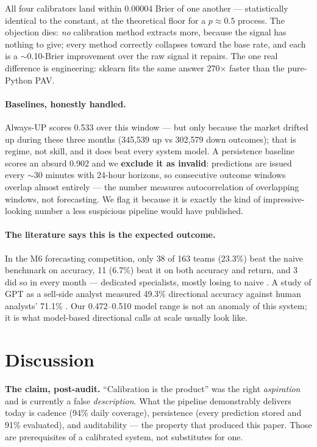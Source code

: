 \documentclass[10pt]{article}
\begin{document}
All four calibrators land within 0.00004 Brier of one another --- statistically identical to the constant, at the theoretical floor for a $p\approx0.5$ process. The objection dies: \emph{no} calibration method extracts more, because the signal has nothing to give; every method correctly collapses toward the base rate, and each is a $\sim$0.10-Brier improvement over the raw signal it repairs. The one real difference is engineering: sklearn fits the same answer 270$\times$ faster than the pure-Python PAV.

\paragraph{Baselines, honestly handled.} Always-UP scores 0.533 over this window --- but only because the market drifted up during these three months (345{,}539 up vs 302{,}579 down outcomes); that is regime, not skill, and it does beat every system model. A persistence baseline scores an absurd 0.902 and we \textbf{exclude it as invalid}: predictions are issued every $\sim$30 minutes with 24-hour horizons, so consecutive outcome windows overlap almost entirely --- the number measures autocorrelation of overlapping windows, not forecasting. We flag it because it is exactly the kind of impressive-looking number a less suspicious pipeline would have published.

\paragraph{The literature says this is the expected outcome.} In the M6 forecasting competition, only 38 of 163 teams (23.3\%) beat the naive benchmark on accuracy, 11 (6.7\%) beat it on both accuracy and return, and 3 did so in every month --- dedicated specialists, mostly losing to naive \citep{m62023}. A study of GPT as a sell-side analyst measured 49.3\% directional accuracy against human analysts' 71.1\% \citep{gptanalyst2024}. Our 0.472--0.510 model range is not an anomaly of this system; it is what model-based directional calls at scale usually look like.

\section{Discussion}
\label{sec:discussion}

\textbf{The claim, post-audit.} ``Calibration is the product'' was the right \emph{aspiration} and is currently a false \emph{description}. What the pipeline demonstrably delivers today is cadence (94\% daily coverage), persistence (every prediction stored and 91\% evaluated), and auditability --- the property that produced this paper. Those are prerequisites of a calibrated system, not substitutes for one.
\end{document}
